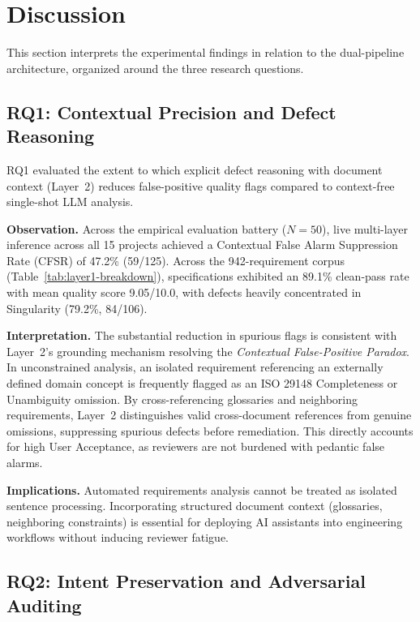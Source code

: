 \documentclass[journal]{IEEEtran}
\begin{document}
\section{Discussion}
\label{sec:discussion}

This section interprets the experimental findings in relation to the dual-pipeline architecture, organized around the three research questions.

\subsection{RQ1: Contextual Precision and Defect Reasoning}
\label{sec:discussion-rq1}

RQ1 evaluated the extent to which explicit defect reasoning with document context (Layer~2) reduces false-positive quality flags compared to context-free single-shot LLM analysis.

\textbf{Observation.} Across the empirical evaluation battery ($N=50$), live multi-layer inference across all 15 projects achieved a Contextual False Alarm Suppression Rate (CFSR) of 47.2\% (59/125). Across the 942-requirement corpus (Table~\ref{tab:layer1-breakdown}), specifications exhibited an 89.1\% clean-pass rate with mean quality score 9.05/10.0, with defects heavily concentrated in Singularity (79.2\%, 84/106).

\textbf{Interpretation.} The substantial reduction in spurious flags is consistent with Layer~2's grounding mechanism resolving the \emph{Contextual False-Positive Paradox}. In unconstrained analysis, an isolated requirement referencing an externally defined domain concept is frequently flagged as an ISO 29148 Completeness or Unambiguity omission. By cross-referencing glossaries and neighboring requirements, Layer~2 distinguishes valid cross-document references from genuine omissions, suppressing spurious defects before remediation. This directly accounts for high User Acceptance, as reviewers are not burdened with pedantic false alarms.

\textbf{Implications.} Automated requirements analysis cannot be treated as isolated sentence processing. Incorporating structured document context (glossaries, neighboring constraints) is essential for deploying AI assistants into engineering workflows without inducing reviewer fatigue.

\subsection{RQ2: Intent Preservation and Adversarial Auditing}
\label{sec:discussion-rq2}
\end{document}

